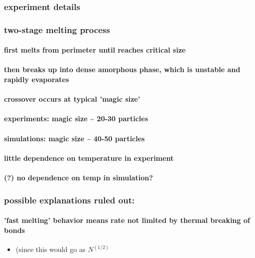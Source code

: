 \documentclass{umthesis}
\begin{document}
\subsubsection{experiment details}
\label{sec-2.1.2.2}
\subsubsection{two-stage melting process}
\label{sec-2.1.2.3}
\paragraph{first melts from perimeter until reaches critical size}
\label{sec-2.1.2.3.1}
\paragraph{then breaks up into dense amorphous phase, which is unstable and rapidly evaporates}
\label{sec-2.1.2.3.2}
\paragraph{crossover occurs at typical 'magic size'}
\label{sec-2.1.2.3.3}
\paragraph{experiments: magic size \~{} 20-30 particles}
\label{sec-2.1.2.3.4}
\paragraph{simulations: magic size \~{} 40-50 particles}
\label{sec-2.1.2.3.5}
\paragraph{little dependence on temperature in experiment}
\label{sec-2.1.2.3.6}
\paragraph{(?) no dependence on temp in simulation?}
\label{sec-2.1.2.3.7}
\subsubsection{possible explanations ruled out:}
\label{sec-2.1.2.4}
\paragraph{'fast melting' behavior means rate not limited by thermal breaking of bonds}
\label{sec-2.1.2.4.1}
\begin{itemize}

\item (since this would go as $N^(1/2)$\\
\label{sec-2.1.2.4.1.1}%
\end{itemize} %
\end{document}
